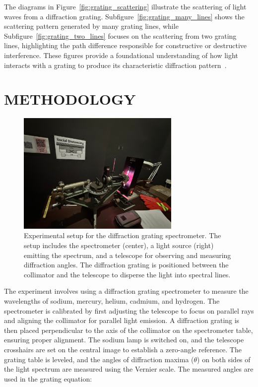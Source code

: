 \documentclass[a4paper,11pt]{article}
\begin{document}
The diagrams in Figure~\ref{fig:grating_scattering} illustrate the scattering of light waves from a diffraction grating. Subfigure~\ref{fig:grating_many_lines} shows the scattering pattern generated by many grating lines, while Subfigure~\ref{fig:grating_two_lines} focuses on the scattering from two grating lines, highlighting the path difference responsible for constructive or destructive interference. These figures provide a foundational understanding of how light interacts with a grating to produce its characteristic diffraction pattern~\cite{cortland_lab_manual}.

\newpage
\section*{\center METHODOLOGY}
\label{sec:METHODOLOGY}
\begin{figure}[H]
  \centering
  \includegraphics[width=0.7\textwidth]{experiment_setup_image.png}
  \caption{Experimental setup for the diffraction grating spectrometer. The setup includes the spectrometer (center), a light source (right) emitting the spectrum, and a telescope for observing and measuring diffraction angles. The diffraction grating is positioned between the collimator and the telescope to disperse the light into spectral lines.}
  \label{fig:experiment_setup}
\end{figure}

\quad The experiment involves using a diffraction grating spectrometer to measure the wavelengths of sodium, mercury, helium, cadmium, and hydrogen. The spectrometer is calibrated by first adjusting the telescope to focus on parallel rays and aligning the collimator for parallel light emission. A diffraction grating is then placed perpendicular to the axis of the collimator on the spectrometer table, ensuring proper alignment. The sodium lamp is switched on, and the telescope crosshairs are set on the central image to establish a zero-angle reference. The grating table is leveled, and the angles of diffraction maxima (\( \theta \)) on both sides of the light spectrum are measured using the Vernier scale. The measured angles are used in the grating equation:
\end{document}
